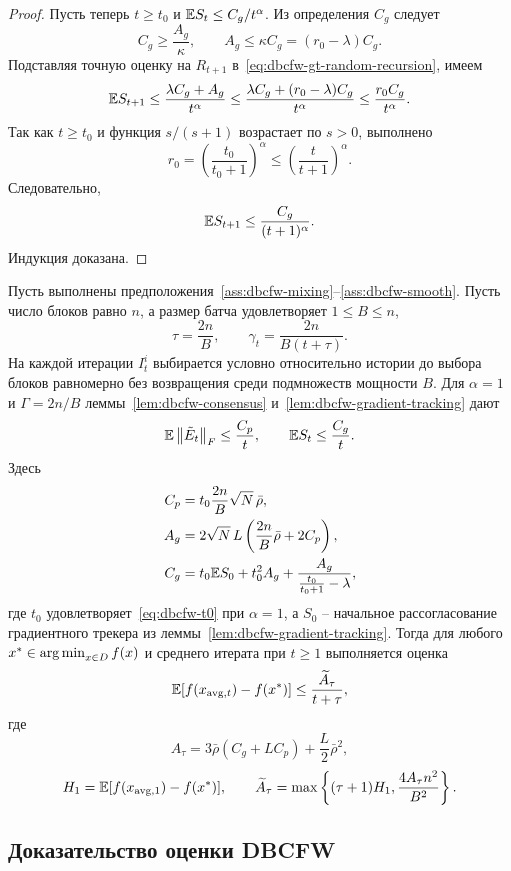 \begin{proof}
Пусть теперь $t\geq t_0$ и $\mathbb{E} S_t\leq C_g/t^\alpha$.
Из определения $C_g$ следует
\[
    C_g\geq\frac{A_g}{\kappa},
    \qquad
    A_g\leq\kappa C_g=(r_0-\lambda)C_g.
\]
Подставляя точную оценку на $R_{t+1}$ в~\eqref{eq:dbcfw-gt-random-recursion}, имеем
\[
    \mathbb{E} S_{t+1}
    \leq
    \frac{\lambda C_g+A_g}{t^\alpha}
    \leq
    \frac{\lambda C_g+(r_0-\lambda)C_g}{t^\alpha}
    \leq
    \frac{r_0C_g}{t^\alpha}.
\]
Так как $t\geq t_0$ и функция $s/(s+1)$ возрастает по $s>0$, выполнено
\[
    r_0=\left(\frac{t_0}{t_0+1}\right)^\alpha
    \leq
    \left(\frac{t}{t+1}\right)^\alpha .
\]
Следовательно,
\[
    \mathbb{E} S_{t+1}
    \leq
    \frac{C_g}{(t+1)^\alpha}.
\]
Индукция доказана.
\end{proof}

\begin{theorem}
\label{thm:dbcfw-rate}
Пусть выполнены предположения~\ref{ass:dbcfw-mixing}--\ref{ass:dbcfw-smooth}.
Пусть число блоков равно $n$, а размер батча удовлетворяет $1\leq B\leq n$,
\[
    \tau=\frac{2n}{B},
    \qquad
    \gamma_t=\frac{2n}{B(t+\tau)}.
\]
На каждой итерации $I_t^i$ выбирается условно относительно истории до выбора блоков
равномерно без возвращения среди подмножеств мощности $B$.
Для $\alpha=1$ и $\Gamma=2n/B$ леммы~\ref{lem:dbcfw-consensus}
и~\ref{lem:dbcfw-gradient-tracking} дают
\[
    \mathbb{E}\left\|\tilde E_t\right\|_F
    \leq\frac{C_p}{t},
    \qquad
    \mathbb{E} S_t
    \leq\frac{C_g}{t}.
\]
Здесь
\[
\begin{aligned}
    C_p&=t_0\frac{2n}{B}\sqrt N\,\bar\rho,\\
    A_g&=2\sqrt N\,L\left(\frac{2n}{B}\bar\rho+2C_p\right),\\
    C_g&=
    t_0\mathbb{E} S_0
    +
    t_0^2A_g
    +
    \frac{A_g}{
        \frac{t_0}{t_0+1}-\lambda
    },
\end{aligned}
\]
где $t_0$ удовлетворяет~\eqref{eq:dbcfw-t0} при $\alpha=1$, а $S_0$ -- начальное
рассогласование градиентного трекера из леммы~\ref{lem:dbcfw-gradient-tracking}.
Тогда для любого $x^\ast\in\operatorname*{arg\,min}_{x\in D}f(x)$ и среднего итерата при $t\geq1$
выполняется оценка
\[
    \mathbb{E}[f(x_{\mathrm{avg},t})-f(x^\ast)]
    \leq
    \frac{\widetilde A_\tau}{t+\tau},
\]
где
\[
    A_\tau=
    3\bar\rho(C_g+LC_p)+\frac{L}{2}\bar\rho^2,
\]
\[
    H_1=\mathbb{E}[f(x_{\mathrm{avg},1})-f(x^\ast)],
    \qquad
    \widetilde A_\tau
    =
    \max
    \left\{
        (\tau+1)H_1,
        \frac{4A_\tau n^2}{B^2}
    \right\}.
\]
\end{theorem}

\subsection{Доказательство оценки DBCFW}

